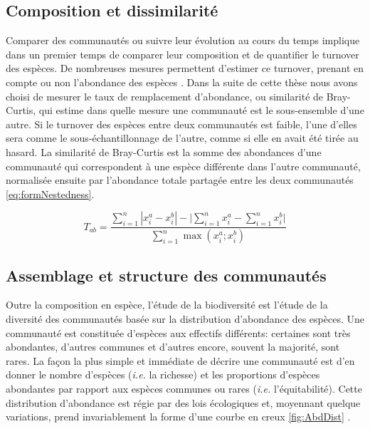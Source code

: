 \documentclass[
  11pt,
  french,
  A4paper,
  extrafontsizes,onecolumn,openright
  ]{memoir}
\begin{document}
\subsection{Composition et
dissimilarité}\label{composition-et-dissimilarite}

Comparer des communautés ou suivre leur évolution au cours du temps
implique dans un premier temps de comparer leur composition et de
quantifier le turnover des espèces. De nombreuses mesures permettent
d'estimer ce turnover, prenant en compte ou non l'abondance des espèces
\autocite{Podani2013}. Dans la suite de cette thèse nous avons choisi de
mesurer le taux de remplacement d'abondance, ou similarité de
Bray-Curtis, qui estime dans quelle mesure une communauté est le
sous-ensemble d'une autre. Si le turnover des espèces entre deux
communautés est faible, l'une d'elles sera comme le sous-échantillonnage
de l'autre, comme si elle en avait été tirée au hasard. La similarité de
Bray-Curtis est la somme des abondances d'une communauté qui
correspondent à une espèce différente dans l'autre communauté,
normalisée ensuite par l'abondance totale partagée entre les deux
communautés \eqref{eq:formNestedness}.

\begin{equation}
T_{ab}=\frac{\sum_{i=1}^{n}|x_i^a - x_i^b| - \bigg| \sum_{i=1}^{n}{x_i^a} - \sum_{i=1}^{n}{x_i^b} \bigg|}{\sum_{i=1}^{n}\max{\left( x_i^a;x_i^b \right)}}
\label{eq:formNestedness}
\end{equation}

\subsection{Assemblage et structure des
communautés}\label{assemblage-et-structure-des-communautes}

Outre la composition en espèce, l'étude de la biodiversité est l'étude
de la diversité des communautés basée sur la distribution d'abondance
des espèces. Une communauté est constituée d'espèces aux effectifs
différents: certaines sont très abondantes, d'autres communes et
d'autres encore, souvent la majorité, sont rares. La façon la plus
simple et immédiate de décrire une communauté est d'en donner le nombre
d'espèces (\emph{i.e.} la richesse) et les proportions d'espèces
abondantes par rapport aux espèces communes ou rares (\emph{i.e.}
l'équitabilité). Cette distribution d'abondance est régie par des lois
écologiques et, moyennant quelque variations, prend invariablement la
forme d'une courbe en creux \ref{fig:AbdDist} \autocite{McGill2007}.
\end{document}
